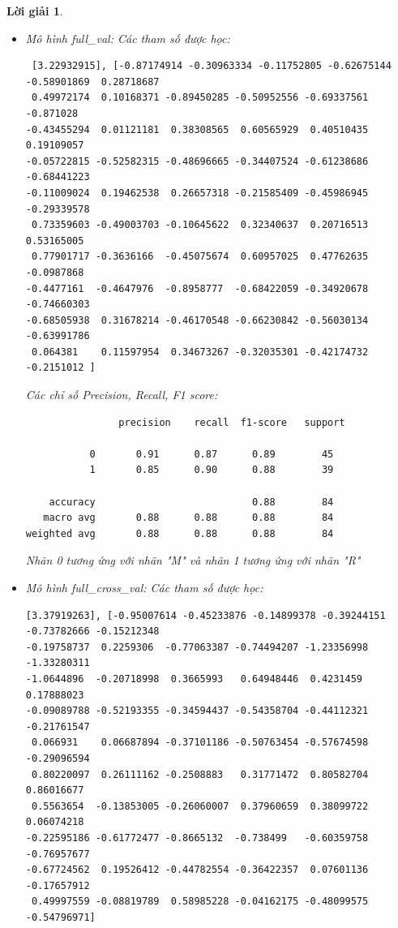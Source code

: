 \documentclass[14pt, a4paper]{article}
\theoremstyle{sltheorem}
\theoremstyle{soltheorem}
\newtheorem*{loigiai}{Lời giải}
\begin{document}
\begin{loigiai}
    \begin{itemize}
        \item Mô hình full\_val:
        Các tham số được học:
        \begin{verbatim}
 [3.22932915], [-0.87174914 -0.30963334 -0.11752805 -0.62675144 -0.58901869  0.28718687
 0.49972174  0.10168371 -0.89450285 -0.50952556 -0.69337561 -0.871028
-0.43455294  0.01121181  0.38308565  0.60565929  0.40510435  0.19109057
-0.05722815 -0.52582315 -0.48696665 -0.34407524 -0.61238686 -0.68441223
-0.11009024  0.19462538  0.26657318 -0.21585409 -0.45986945 -0.29339578
 0.73359603 -0.49003703 -0.10645622  0.32340637  0.20716513  0.53165005
 0.77901717 -0.3636166  -0.45075674  0.60957025  0.47762635 -0.0987868
-0.4477161  -0.4647976  -0.8958777  -0.68422059 -0.34920678 -0.74660303
-0.68505938  0.31678214 -0.46170548 -0.66230842 -0.56030134 -0.63991786
 0.064381    0.11597954  0.34673267 -0.32035301 -0.42174732 -0.2151012 ]
        \end{verbatim}
        Các chỉ số Precision, Recall, F1 score:
        \begin{verbatim}
                precision    recall  f1-score   support

           0       0.91      0.87      0.89        45
           1       0.85      0.90      0.88        39

    accuracy                           0.88        84
   macro avg       0.88      0.88      0.88        84
weighted avg       0.88      0.88      0.88        84
        \end{verbatim}

        Nhãn 0 tương ứng với nhãn "M" và nhãn 1 tương ứng với nhãn "R"

        \item Mô hình full\_cross\_val:
        Các tham số được học:

        \begin{verbatim}
[3.37919263], [-0.95007614 -0.45233876 -0.14899378 -0.39244151 -0.73782666 -0.15212348
-0.19758737  0.2259306  -0.77063387 -0.74494207 -1.23356998 -1.33280311
-1.0644896  -0.20718998  0.3665993   0.64948446  0.4231459   0.17888023
-0.09089788 -0.52193355 -0.34594437 -0.54358704 -0.44112321 -0.21761547
 0.066931    0.06687894 -0.37101186 -0.50763454 -0.57674598 -0.29096594
 0.80220097  0.26111162 -0.2508883   0.31771472  0.80582704  0.86016677
 0.5563654  -0.13853005 -0.26060007  0.37960659  0.38099722  0.06074218
-0.22595186 -0.61772477 -0.8665132  -0.738499   -0.60359758 -0.76957677
-0.67724562  0.19526412 -0.44782554 -0.36422357  0.07601136 -0.17657912
 0.49997559 -0.08819789  0.58985228 -0.04162175 -0.48099575 -0.54796971]
        \end{verbatim}


\end{itemize}
\end{loigiai}
\end{document}
